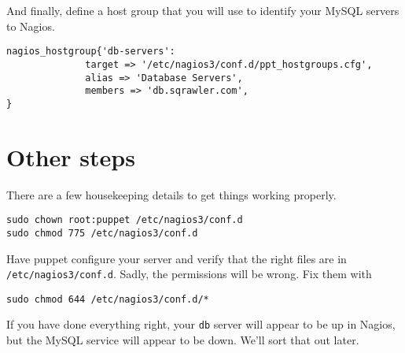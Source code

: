 \documentclass{article}         %
\begin{document}
And finally, define a host group that you will use to 
identify your MySQL servers to Nagios.

\begin{verbatim}
nagios_hostgroup{'db-servers':
              target => '/etc/nagios3/conf.d/ppt_hostgroups.cfg',
              alias => 'Database Servers',
              members => 'db.sqrawler.com',
}

\end{verbatim}


\section{Other steps}

There are a few housekeeping details to get things working properly.

\begin{verbatim}
sudo chown root:puppet /etc/nagios3/conf.d
sudo chmod 775 /etc/nagios3/conf.d 
\end{verbatim}

Have puppet configure your server and verify that the right files are in 
\texttt{/etc/nagios3/conf.d}.  Sadly, the permissions will be wrong.  
Fix them with

\begin{verbatim}
sudo chmod 644 /etc/nagios3/conf.d/* 
\end{verbatim}

If you have done everything right, your \texttt{db} server will appear to be up in Nagios,
but the MySQL service will appear to be down. We'll sort that out later.
\end{document}
